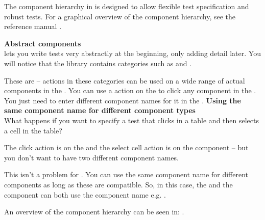The component hierarchy in \app{} is designed to allow flexible test specification and robust tests. For a graphical overview of the component hierarchy, see the reference manual . 
\bigskip

\textbf{Abstract components}\\

\app{} lets you write tests very abstractly at the beginning, only adding detail later. You will notice that the library contains categories such as  and . 

These are  -- actions in these categories can be used on a wide range of actual components in the \gdaut{}. You can use a  action on the  to click any component in the \gdaut{}. You just need to enter different component names for it in the \gdcompnamesview{}. 
\bigskip
\textbf{Using the same component name for different component types}\\

What happens if you want to specify a test that clicks in a table and then selects a cell in the table?

The click action is on the  and the select cell action is on the  component -- but you don't want to have two different component names. 

This isn't a problem for \app{}. You can use the same component name for different components as long as these are compatible. So, in this case, the  and the   component can both use the component name e.g. . 


An overview of the component hierarchy can be seen in: .
